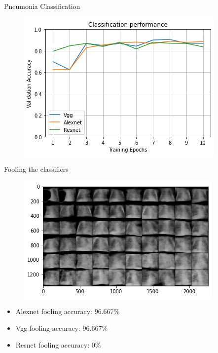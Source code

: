 \begin{frame}{Pneumonia Classification}
    \begin{figure}
        \centering
        \includegraphics[width=.9\textwidth]{Images/classification_performance.png}
    \end{figure}
\end{frame}
\begin{frame}{Fooling the classifiers}
    \begin{figure}
        \centering
        \includegraphics[width=.7\textwidth]{Images/xray_test_example.png}
    \end{figure}
    \begin{itemize}
        \item Alexnet fooling accuracy: $96.667\%$
        \item Vgg fooling accuracy: $96.667\%$
        \item Resnet fooling accuracy: $0\%$
    \end{itemize}
\end{frame}

